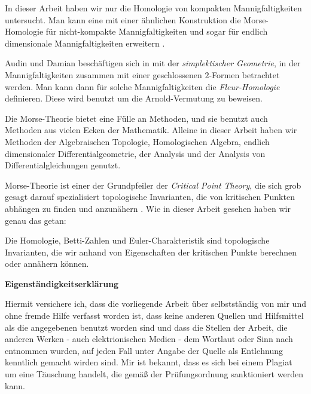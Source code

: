 \documentclass[a4paper,11pt,twoside]{scrreport}
\begin{document}
In dieser Arbeit haben wir nur die Homologie von kompakten Mannigfaltigkeiten untersucht. Man kann
eine mit einer ähnlichen Konstruktion die Morse-Homologie für nicht-kompakte Mannigfaltigkeiten 
und sogar für endlich dimensionale Mannigfaltigkeiten erweitern \cite{mercuri}.

Audin und Damian beschäftigen sich in \cite{audin} mit der \textit{simplektischer Geometrie},
in der Mannigfaltigkeiten zusammen mit einer geschlossenen $2$-Formen betrachtet werden. Man kann 
dann für solche Mannigfaltigkeiten die \textit{Fleur-Homologie} definieren. Diese wird benutzt
um die Arnold-Vermutung zu beweisen.

Die Morse-Theorie bietet eine Fülle an Methoden, und sie benutzt auch Methoden aus vielen Ecken der 
Mathematik. Alleine in dieser Arbeit haben wir Methoden der Algebraischen Topologie,
Homologischen Algebra, endlich dimensionaler Differentialgeometrie, der Analysis und der Analysis von 
Differentialgleichungen genutzt. 

Morse-Theorie ist einer der Grundpfeiler der \textit{Critical Point Theory}, die sich grob gesagt 
darauf spezialisiert topologische Invarianten, die von kritischen Punkten abhängen zu finden und 
anzunähern \cite{mercuri}. Wie in dieser Arbeit gesehen haben wir genau das getan:

Die Homologie, Betti-Zahlen und Euler-Charakteristik sind topologische Invarianten, die wir anhand 
von Eigenschaften der kritischen Punkte berechnen oder annähern können. 


% 

\AtNextBibliography{\small}
\printbibliography


\newpage
\begin{center}
\large{\textbf{Eigenständigkeitserklärung}}
\end{center}

\vspace{-6cm}

\normalsize Hiermit versichere ich, dass die vorliegende Arbeit über 
\textit{} selbstständig von mir und ohne fremde Hilfe verfasst 
worden ist, dass keine anderen Quellen und Hilfsmittel als die angegebenen benutzt worden sind und 
dass die Stellen der Arbeit, die anderen Werken - auch elektrionischen Medien - dem Wortlaut oder 
Sinn nach entnommen wurden, auf jeden Fall unter Angabe der Quelle als Entlehnung kenntlich gemacht 
wirden sind. Mir ist bekannt, dass es sich bei einem Plagiat um eine Täuschung handelt, die gemäß 
der Prüfungsordnung sanktioniert werden kann.
\end{document}
